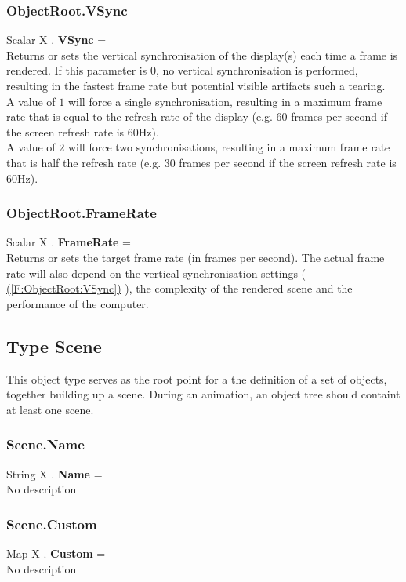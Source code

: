 \documentclass[10pt]{book}
\newcommand{\linkitem}[1]{\hyperref[#1]{\nameref{#1} (\ref{#1})}}
\begin{document}
\subsubsection{ObjectRoot.VSync \label{F:ObjectRoot:VSync}}
Scalar X . \textbf{VSync} = \\
Returns or sets the vertical synchronisation of the display(s) each time a frame is rendered.
If this parameter is $0$, no vertical synchronisation is performed, resulting in the fastest frame rate but potential visible artifacts such a tearing. \\
A value of $1$ will force a single synchronisation, resulting in a maximum frame rate that is equal to the refresh rate of the display (e.g. 60 frames per second if the screen refresh rate is 60Hz). \\
A value of $2$ will force two synchronisations, resulting in a maximum frame rate that is half the refresh rate (e.g. 30 frames per second if the screen refresh rate is 60Hz).

\subsubsection{ObjectRoot.FrameRate \label{F:ObjectRoot:FrameRate}}
Scalar X . \textbf{FrameRate} = \\
Returns or sets the target frame rate (in frames per second). The actual frame rate will also depend on the vertical synchronisation settings ( \linkitem{F:ObjectRoot:VSync} ), the complexity of the rendered scene and the performance of the computer.

\subsection{Type Scene \label{T:Scene}}
This object type serves as the root point for a the definition of a set of objects, together building up a scene. During an animation, an object tree should containt at least one scene.

\subsubsection{Scene.Name \label{F:Scene:Name}}
String X . \textbf{Name} = \\
No description

\subsubsection{Scene.Custom \label{F:Scene:Custom}}
Map X . \textbf{Custom} = \\
No description
\end{document}
